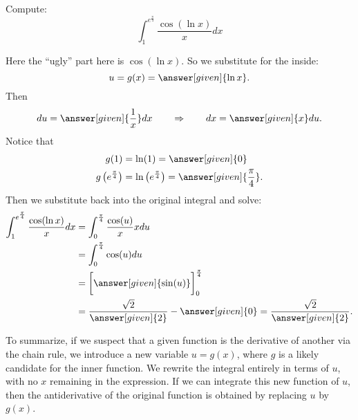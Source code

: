 \documentclass{ximera}
\begin{document}
\begin{example}
  Compute:
  \[
  \int_{1}^{e^{\frac{\pi}{4}}} \frac{\cos(\ln x)}{x} dx
  \]
\begin{explanation}
Here the ``ugly'' part here is $\cos(\ln x)$.  So we substitute for
the inside:
\[
u=g(x)=\answer[given]{\ln x}.
\]
Then
\[
du =  \answer[given]{\frac{1}{x}} dx  \qquad  \Rightarrow \qquad  dx = \answer[given]{x} du.
\]
Notice that
\begin{align*}
g(1) &= \ln (1) = \answer[given]{0} \\
g \left( e^{\frac{\pi}{4}} \right) &= \ln \left( e^{\frac{\pi}{4}} \right) = \answer[given]{\frac{\pi}{4}}.
\end{align*}
Then we substitute back into the original integral and solve:
\begin{align*}
\int_{1}^{e^{\frac{\pi}{4}}} \frac{\cos(\ln x)}{x} dx &= \int_0^{\frac{\pi}{4}} \frac{\cos(u)}{x} x du  \\
&= \int_0^{\frac{\pi}{4}} \cos(u) du  \\
&= \bigg[ \answer[given]{\sin(u)} \bigg]_{0}^{\frac{\pi}{4}}  \\
&= \frac{\sqrt{2}}{\answer[given]{2}} - \answer[given]{0} = \frac{\sqrt{2}}{\answer[given]{2}}.
\end{align*}
\end{explanation}
\end{example}

To summarize, if we suspect that a given function is the derivative of
another via the chain rule, we introduce a new variable $u=g(x)$, where $g$ is a likely candidate for
the inner function. We rewrite the integral
 entirely in terms of $u$, with no $x$ remaining in the
expression. If we can integrate this new function of $u$, then the
antiderivative of the original function is obtained by replacing $u$
by $g(x)$.
\end{document}
